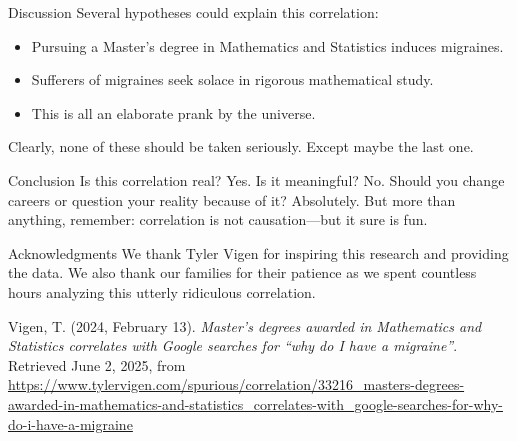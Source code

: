 \documentclass{article}
\begin{document}
\begin{section}{Discussion}
 Several hypotheses could explain this correlation:
 \begin{itemize}
   \item Pursuing a Master's degree in Mathematics and Statistics induces migraines.
   \item Sufferers of migraines seek solace in rigorous mathematical study.
   \item This is all an elaborate prank by the universe.
 \end{itemize}
 Clearly, none of these should be taken seriously. Except maybe the last one.
\end{section}

\begin{section}{Conclusion}
 Is this correlation real? Yes. Is it meaningful? No. Should you change careers or question your reality because of it? Absolutely. But more than anything, remember: correlation is not causation—but it sure is fun.
\end{section}

\begin{section}{Acknowledgments}
 We thank Tyler Vigen for inspiring this research and providing the data. We also thank our families for their patience as we spent countless hours analyzing this utterly ridiculous correlation.
\end{section}


\begin{thebibliography}{9}

  Vigen, T. (2024, February 13). \textit{Master's degrees awarded in Mathematics and Statistics correlates with Google searches for ``why do I have a migraine''}. Retrieved June 2, 2025, from \url{https://www.tylervigen.com/spurious/correlation/33216_masters-degrees-awarded-in-mathematics-and-statistics_correlates-with_google-searches-for-why-do-i-have-a-migraine}

\end{thebibliography}
\end{document}
